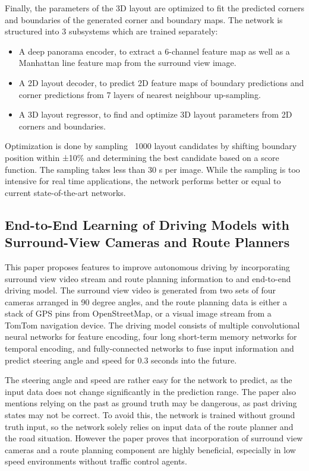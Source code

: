 \documentclass[sigconf]{acmart}
\begin{document}
Finally, the parameters of the 3D layout are optimized to fit the predicted corners and boundaries of the generated corner and boundary maps.
The network is structured into 3 subsystems which are trained separately:
\begin{itemize}
\item A deep panorama encoder, to extract a 6-channel feature map as well as a Manhattan line feature map from the surround view image.
\item A 2D layout decoder, to predict 2D feature maps of boundary predictions and corner predictions from 7 layers of nearest neighbour up-sampling.
\item A 3D layout regressor, to find and optimize 3D layout parameters from 2D corners and boundaries.
\end{itemize}
Optimization is done by sampling ~1000 layout candidates by shifting boundary position within ±10\% and determining the best candidate based on a score function.
The sampling takes less than 30 s per image.
While the sampling is too intensive for real time applications, the network performs better or equal to current state-of-the-art networks.

\subsection{End-to-End Learning of Driving Models with Surround-View Cameras and Route Planners \cite{E2EDrivingModel}}
This paper proposes features to improve autonomous driving by incorporating surround view video stream and route planning information to and end-to-end driving model.
The surround view video is generated from two sets of four cameras arranged in 90 degree angles, and the route planning data is either a stack of GPS pins from OpenStreetMap, or a visual image stream from a TomTom navigation device.
The driving model consists of multiple convolutional neural networks for feature encoding, four long short-term memory networks for temporal encoding, and fully-connected networks to fuse input information and predict steering angle and speed for 0.3 seconds into the future.

The steering angle and speed are rather easy for the network to predict, as the input data does not change significantly in the prediction range.
The paper also mentions relying on the past as ground truth may be dangerous, as past driving states may not be correct.
To avoid this, the network is trained without ground truth input, so the network solely relies on input data of the route planner and the road situation.
However the paper proves that incorporation of surround view cameras and a route planning component are highly beneficial, especially in low speed environments without traffic control agents.
\end{document}

